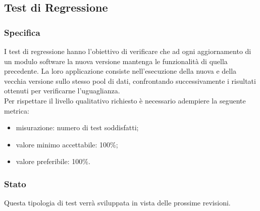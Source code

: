 \subsection{Test di Regressione}

	\subsubsection{Specifica}
		I test di regressione hanno l'obiettivo di verificare che ad ogni aggiornamento di un modulo software la nuova versione mantenga le funzionalità di quella precedente.
		La loro applicazione consiste nell'esecuzione della nuova e della vecchia versione sullo stesso pool di dati, confrontando successivamente i risultati ottenuti per verificarne l'uguaglianza.\\
		Per rispettare il livello qualitativo richiesto è necessario adempiere la seguente metrica:
		\begin{itemize}
			\item misurazione: numero di test soddisfatti;
			\item valore minimo accettabile: 100\%;
			\item valore preferibile: 100\%.
		\end{itemize}
	
	
	\subsubsection{Stato}
		Questa tipologia di test verrà sviluppata in vista delle prossime revisioni.